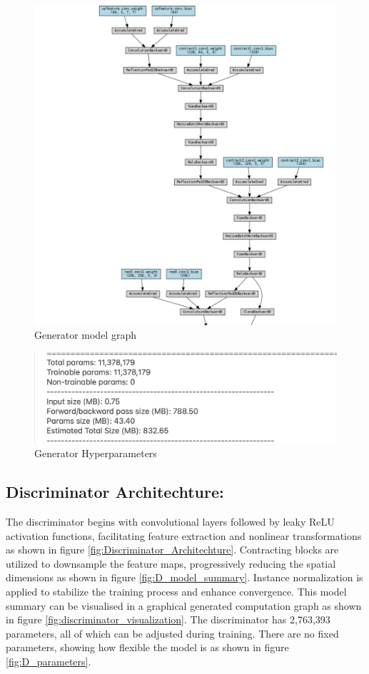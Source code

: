 \documentclass[UKenglish,12pt]{master-style}
\begin{document}
\begin{figure}[htbp]
    \centering
    \includegraphics[width=1\textwidth]{Images/generator_visualization.png}
    \caption{Generator model graph}
    \label{fig:generator_visualization}
\end{figure}

\begin{figure}[htbp]
    \centering
    \includegraphics[width=1\textwidth]{Images/Generator_parameters.png}
    \caption{Generator Hyperparameters}
    \label{fig:Generator_parameters}
\end{figure}

\subsection*{Discriminator Architechture:} The discriminator begins with convolutional layers followed by leaky ReLU activation functions, facilitating feature extraction and nonlinear transformations as shown in figure \ref{fig:Discriminator_Architechture}. Contracting blocks are utilized to downsample the feature maps, progressively reducing the spatial dimensions as shown in figure \ref{fig:D_model_summary}. Instance normalization is applied to stabilize the training process and enhance convergence. This model summary can be visualised in a graphical generated computation graph as shown in figure \ref{fig:discriminator_visualization}. The discriminator has 2,763,393 parameters, all of which can be adjusted during training. There are no fixed parameters, showing how flexible the model is as shown in figure \ref{fig:D_parameters}.
\end{document}
